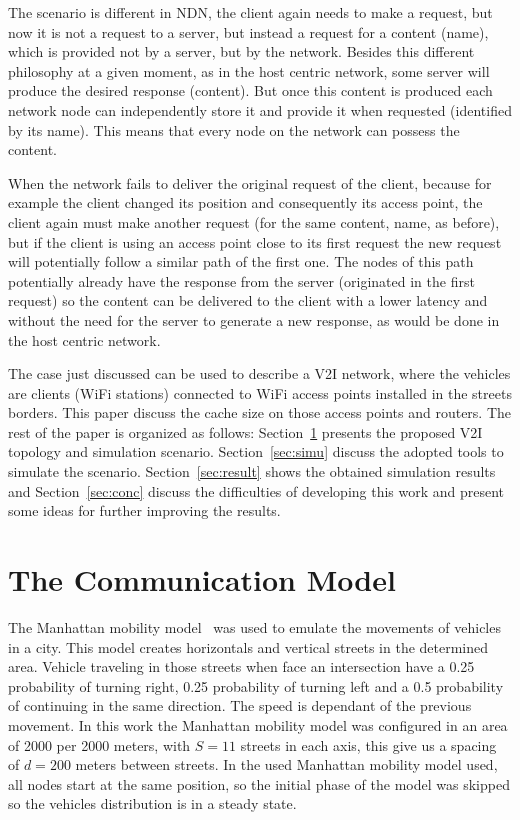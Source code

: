 \documentclass[10pt,a4paper,final]{IEEEtran}
\begin{document}
The scenario is different in NDN, the client again needs to make a request, but
now it is not a request to a server, but instead a request for a content (name),
which is provided not by a server, but by the network. Besides this different
philosophy at a given moment, as in the host centric network, some server will
produce the desired response (content). But once this content is produced each
network node can independently store it and provide it when requested
(identified by its name). This means that every node on the network can possess
the content.

When the network fails to deliver the original request of the client, because
for example the client changed its position and consequently its access point,
the client again must make another request (for the same content, name, as
before), but if the client is using an access point close to its first request
the new request will potentially follow a similar path of the first one. The
nodes of this path potentially already have the response from the server
(originated in the first request) so the content can be delivered to the
client with a lower latency and without the need for the server to generate a
new response, as would be done in the host centric network.

The case just discussed can be used to describe a V2I network, where the vehicles
are clients (WiFi stations) connected to WiFi access points installed in the
streets borders. This paper discuss the cache size on those access points
and routers. The rest of the paper is organized as follows:
Section~\ref{sec:commmodel} presents the proposed V2I topology and simulation
scenario. Section~\ref{sec:simu} discuss the adopted tools to simulate the
scenario.  Section~\ref{sec:result} shows the obtained simulation results and
Section~\ref{sec:conc} discuss the difficulties of developing this work and
present some ideas for further improving the results.

\section{The Communication Model}\label{sec:commmodel}

The Manhattan mobility model~\cite{1208920} was used to emulate the movements
of vehicles in a city. This model creates horizontals and vertical streets in
the determined area. Vehicle traveling in those streets when face an
intersection have a 0.25 probability of turning right, 0.25 probability of
turning left and a 0.5 probability of continuing in the same direction. The
speed is dependant of the previous movement. In this work the Manhattan
mobility model was configured in an area of 2000 per 2000 meters, with $S=11$
streets in each axis, this give us a spacing of $d=200$ meters between streets.
In the used Manhattan mobility model used, all nodes start at the same
position, so the initial phase of the model was skipped so the vehicles
distribution is in a steady state.
\end{document}
